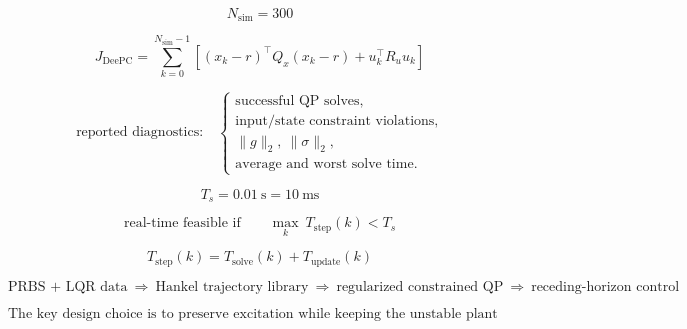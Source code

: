 \[
N_{\mathrm{sim}}=300
\]

\[
J_{\mathrm{DeePC}}
=
\sum_{k=0}^{N_{\mathrm{sim}}-1}
\left[
(x_k-r)^{\top}Q_x(x_k-r)
+u_k^{\top}R_u u_k
\right]
\]

\[
\text{reported diagnostics:}\quad
\begin{cases}
\text{successful QP solves},\\
\text{input/state constraint violations},\\
\|g\|_2,\ \|\sigma\|_2,\\
\text{average and worst solve time}.
\end{cases}
\]


\[
T_s=0.01~\mathrm{s}=10~\mathrm{ms}
\]

\[
\text{real-time feasible if}\qquad
\max_k\ T_{\mathrm{step}}(k)<T_s
\]

\[
T_{\mathrm{step}}(k)
=
T_{\mathrm{solve}}(k)+T_{\mathrm{update}}(k)
\]


\[
\boxed{
\text{PRBS + LQR data}
\ \Longrightarrow\
\text{Hankel trajectory library}
\ \Longrightarrow\
\text{regularized constrained QP}
\ \Longrightarrow\
\text{receding-horizon control}
}
\]

\[
\text{The key design choice is to preserve excitation while keeping the unstable plant near the linear region.}
\]

